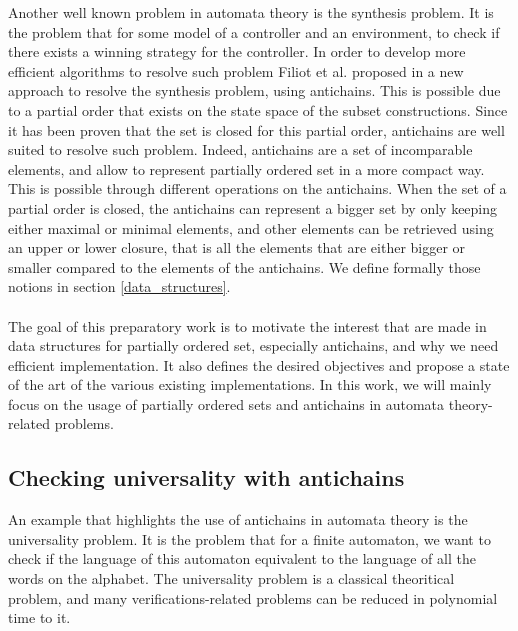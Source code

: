 \documentclass[letterpaper]{article}
\theoremstyle{definition}
\begin{document}
Another well known problem in automata theory is the synthesis problem.
It is the problem that for
some model of a controller and an environment,
to check if there exists a winning strategy for the controller.
In order to develop more efficient algorithms to resolve such
problem Filiot et al. proposed in \cite{ltl_rea} a new approach
to resolve the synthesis problem, using antichains.
This is possible due to a partial order that exists on the state
space of the subset constructions. Since it has been
proven that the set is closed for this partial order,
antichains are well suited to resolve such problem.
Indeed, antichains are a set of incomparable elements, and
allow to represent partially ordered set in a more compact way.
This is possible through different operations on the antichains.
When the set of a partial order is closed, the antichains
can represent a bigger set by only keeping
either maximal or minimal elements,
and other elements can be retrieved using an upper or lower closure,
that is all the elements that are either bigger or smaller
compared to the elements of the antichains.
We define formally
those notions in section \ref{data_structures}.

\paragraph{}

The goal of this preparatory work is to motivate the interest that
are made in data structures for partially ordered set, especially antichains,
and why we need efficient
implementation.
It also defines the desired objectives
and propose a state of the art of the various existing implementations.
In this work, we will mainly focus
on the usage of partially ordered sets and antichains in
automata theory-related problems.

\subsection{Checking universality with antichains}

An example that highlights the use of antichains in automata theory is
the universality problem.
It is the problem that for a finite automaton, we want to
check if the language of this automaton equivalent to the language
of all the words on the alphabet. The universality problem is a classical
theoritical problem, and many verifications-related problems can be
reduced in polynomial time to it.

\paragraph{}
\end{document}
